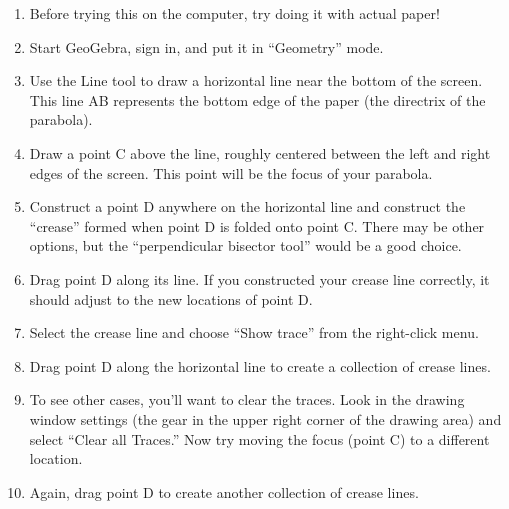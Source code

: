 \begin{enumerate}

\item Before trying this on the computer, try doing it with actual paper!

\vfill

\item Start GeoGebra, sign in, and put it in ``Geometry'' mode.

\vfill

\item Use the Line tool to draw a horizontal line near the bottom of the screen. This line AB represents the bottom edge of the paper (the directrix of the parabola).

\vfill

\item Draw a point C above the line, roughly centered between the left and right edges of the screen.	This point will be the focus of your parabola.

\vfill

\item Construct a point D anywhere on the horizontal line and construct the “crease” formed when point D is folded onto point C. There may be other options, but the ``perpendicular bisector tool'' would be a good choice.

\vfill

\item Drag point D along its line. If you constructed your crease line correctly, it should adjust to the new locations of point D.

\vfill

\newpage

\item Select the crease line and choose ``Show trace'' from the right-click menu.

\vfill

\item Drag point D along the horizontal line to create a collection of crease lines.

\vfill

\item To see other cases, you'll want to clear the traces.  Look in the drawing window settings (the gear in the upper right corner of the drawing area) and select ``Clear all Traces.''  Now try moving the focus (point C) to a different location.

\vfill

\item Again, drag point D to create another collection of crease lines.


\end{enumerate}
